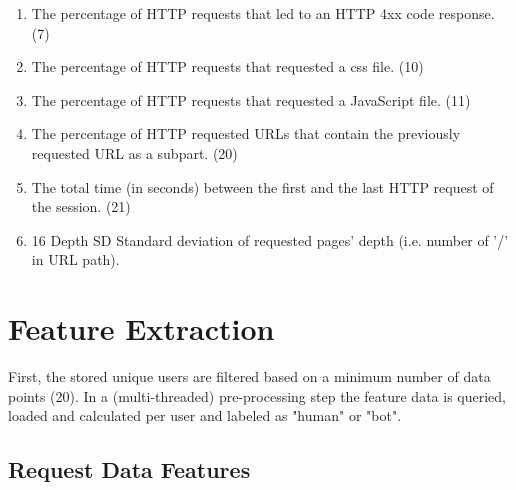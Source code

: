 \documentclass[
    fontsize=12pt,
    headings=small,
    parskip=half,           %
    bibliography=totoc,
    numbers=noenddot,       %
    open=any,               %
    final                   %
]{scrreprt}
\begin{document}
\begin{enumerate}
	\item The percentage of HTTP requests that led to an HTTP 4xx code response. (7)
	\item The percentage of HTTP requests that requested a css file. (10)
	\item The percentage of HTTP requests that requested a JavaScript file. (11)
	\item The percentage of HTTP requested URLs that contain the previously requested URL as a subpart. (20)
	\item The total time (in seconds) between the first and the last HTTP request of the session. (21)
	\item 16 Depth SD Standard deviation of requested pages' depth (i.e. number of ’/’ in URL path).
\end{enumerate}






\section{Feature Extraction}

First, the stored unique users are filtered based on a minimum number of data points (20). In a (multi-threaded) pre-processing step the feature data is queried, loaded and calculated per user and labeled as "human" or "bot".

\subsection{Request Data Features}
\end{document}

